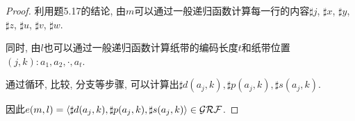 \begin{proof}
	利用题5.17的结论, 由$m$可以通过一般递归函数计算每一行的内容$\sharp j$, $\sharp x$, $\sharp y$, $\sharp z$, $\sharp u$, $\sharp v$, $\sharp w$.
	
	同时, 由$l$也可以通过一般递归函数计算纸带的编码长度$t$和纸带位置$(j,k):a_1,a_2,\cdot,a_t$.
	
	通过循环, 比较, 分支等步骤, 可以计算出$\sharp d(a_j, k),\sharp p(a_j, k),\sharp s(a_j, k)$.
	
	因此$e(m,l)=\langle\sharp d(a_j,k),\sharp p(a_j, k),\sharp s(a_j, k)\rangle\in\mathcal{GRF}$.
\end{proof}